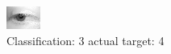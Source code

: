 \begin{figure}[h!]
\begin{center}
\includegraphics[width=0.60\columnwidth]{figures/ID2652_class_3_target_4.png}
\end{center}
\caption{ Classification: 3 actual target: 4}
\label{fig:ID2652_class_3_target_4}
\end{figure}
